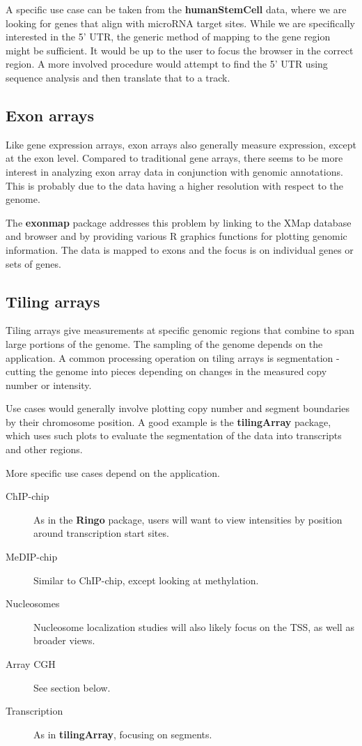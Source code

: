 \documentclass{article}
\begin{document}
A specific use case can be taken from the \textbf{humanStemCell} data, where we are looking for genes that align with microRNA target sites. While we are specifically interested in the 5' UTR, the generic method of mapping to the gene region might be sufficient. It would be up to the user to focus the browser in the correct region. A more involved procedure would attempt to find the 5' UTR using sequence analysis and then translate that to a track.

\subsection{Exon arrays}
\label{sec:exon}

Like gene expression arrays, exon arrays also generally measure expression, except at the exon level. Compared to traditional gene arrays, there seems to be more interest in analyzing exon array data in conjunction with genomic annotations. This is probably due to the data having a higher resolution with respect to the genome.

The \textbf{exonmap} package addresses this problem by linking to the XMap database and browser and by providing various R graphics functions for plotting genomic information. The data is mapped to exons and the focus is on individual genes or sets of genes.

\subsection{Tiling arrays}
\label{sec:tiling}

Tiling arrays give measurements at specific genomic regions that combine to span large portions of the genome. The sampling of the genome depends on the application. A common processing operation on tiling arrays is segmentation - cutting the genome into pieces depending on changes in the measured copy number or intensity.

Use cases would generally involve plotting copy number and segment boundaries by their chromosome position.  A good example is the \textbf{tilingArray} package, which uses such plots to evaluate the segmentation of the data into transcripts and other regions.

More specific use cases depend on the application.
\begin{description}
\item[ChIP-chip] As in the \textbf{Ringo} package, users will want to view intensities by position around transcription start sites.
\item[MeDIP-chip] Similar to ChIP-chip, except looking at methylation.
\item[Nucleosomes] Nucleosome localization studies will also likely focus on the TSS, as well as broader views.
\item[Array CGH] See section below.
\item[Transcription] As in \textbf{tilingArray}, focusing on segments.
\end{description}
\end{document}
